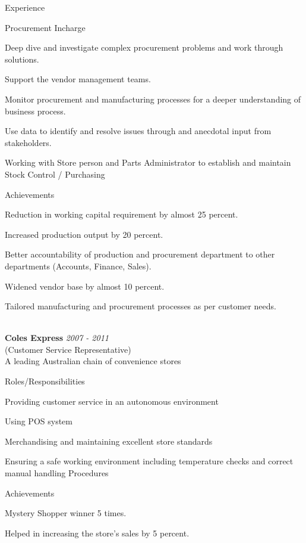 \documentclass{resume}
\begin{document}
\begin{rSection}{Experience}
\begin{rSubsection}{}{}{Procurement Incharge}{} 
\item Deep dive and investigate complex procurement problems and work through solutions.
\item Support the vendor management teams.
\item Monitor procurement and manufacturing processes for a deeper understanding of business process.
\item Use data to identify and resolve issues through and anecdotal input from stakeholders.
\item Working with Store person and Parts Administrator to establish and maintain Stock Control / Purchasing
\end{rSubsection}

\begin{rSubsection}{Achievements}{}{}{}
\item Reduction in working capital requirement by almost 25 percent.
\item Increased production output by 20 percent.
\item Better accountability of production and procurement department to other departments (Accounts, Finance, Sales).
\item Widened vendor base by almost 10 percent.
\item Tailored manufacturing and procurement processes as per customer needs.\\\\
\end{rSubsection}

{\bf Coles Express} \hfill {\em  2007 - 2011} 
\\ (Customer Service Representative)
\\ A leading Australian chain of convenience stores

\begin{rSubsection}{Roles/Responsibilities}{}{}{}   
 \item Providing customer service in an autonomous environment
 \item Using POS system
 \item Merchandising and maintaining excellent store standards
 \item Ensuring a safe working environment including temperature checks and correct manual handling Procedures 
\end{rSubsection}

\begin{rSubsection}{Achievements}{}{}{}
 \item Mystery Shopper winner 5 times.
 \item Helped in increasing the store's sales by 5 percent.
\end{rSubsection}
\end{rSection}
\end{document}
